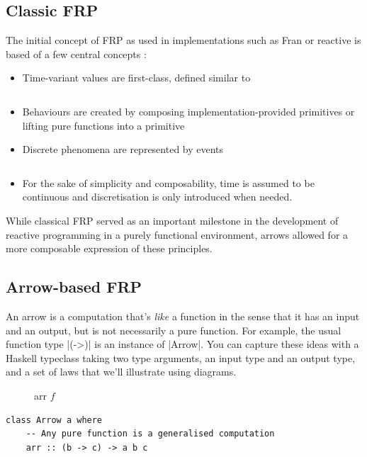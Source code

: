 \documentclass[pdftex,a4paper]{extarticle}
\begin{document}
\subsection{Classic FRP}
The initial concept of FRP as used in implementations such as Fran \cite{ElliottHudak97:Fran} or reactive \cite{haskell-wiki-reactive} is based of a few central concepts \cite{conal-what-is-frp,Elliott2009-push-pull-frp}:
\begin{itemize}
\item Time-variant values are first-class, defined similar to \cite{haskell-wiki-frp}
\inputminted{haskell}{Behaviour.hs}
\item Behaviours are created by composing implementation-provided primitives or lifting pure functions into a primitive
\item Discrete phenomena are represented by events
\inputminted{haskell}{Event.hs}
\item For the sake of simplicity and composability, time is assumed to be continuous and discretisation is only introduced when needed.
\end{itemize}

While classical FRP served as an important milestone in the development of reactive programming in a purely functional environment, arrows allowed for a more composable expression of these principles.

\subsection{Arrow-based FRP}
An arrow is a computation that's \emph{like} a function in the sense that it has an input and an output, but is not necessarily a pure function. For example, the usual function type |(->)| is an instance of |Arrow|. You can capture these ideas with a Haskell typeclass taking two type arguments, an input type and an output type, and a set of laws that we'll illustrate using diagrams.
\begin{figure}[ht]
\centering
{}
\caption{arr $f$}
\end{figure}
\begin{verbatim}
class Arrow a where
    -- Any pure function is a generalised computation
    arr :: (b -> c) -> a b c
\end{verbatim}
\end{document}
